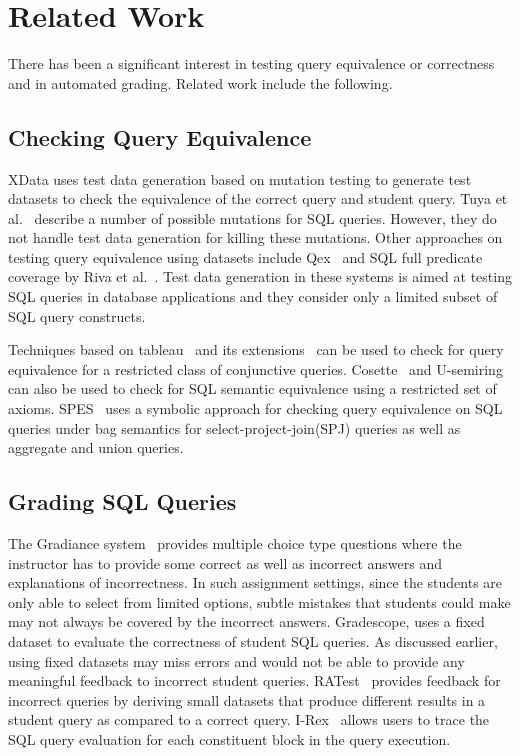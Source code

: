 \section{Related Work}
\label{sec:relwork}
There has been a significant interest in testing query equivalence or correctness and in automated grading. Related work include the following.

\subsection*{Checking Query Equivalence}

XData uses test data generation based on mutation testing to generate test datasets to check the equivalence of the correct query and student query. Tuya et al.~\cite{mutation1} describe a number of possible mutations for SQL queries. However, they do not handle test data generation for killing these mutations. Other approaches on testing query equivalence using datasets include Qex~\cite{QEX} and SQL full predicate coverage by Riva et al.~\cite{Riva:2010}. Test data generation in these systems is aimed at testing SQL queries in database applications and they consider only a limited subset of SQL query constructs. 

Techniques based on tableau~\cite{tableaux} and its extensions~\cite{tableaux1, tableaux2} can be used to check for query equivalence for a restricted class of conjunctive queries. Cosette~\cite{cosette} and U-semiring~\cite{semantic} can also be used to check for SQL semantic equivalence using a restricted set of axioms. 
SPES~\cite{spes} uses a symbolic approach for checking query equivalence on SQL queries under bag semantics for select-project-join(SPJ) queries as well as aggregate and union queries. 

\subsection*{Grading SQL Queries}
The Gradiance system~\cite{gradience} provides multiple choice type questions where the instructor has to provide some correct as well as incorrect answers and explanations of incorrectness. In such assignment settings, since the students are only able to select from limited options, subtle mistakes that students could make may not always be covered by the incorrect answers. Gradescope\cite{gradescope}, uses a fixed dataset to evaluate the correctness of student SQL queries. As discussed earlier, using fixed datasets may miss errors and would not be able to provide any meaningful feedback to incorrect student queries. RATest~\cite{rattest} provides feedback for incorrect queries by deriving small datasets that produce different results in a student query as compared to a correct query. I-Rex~\cite{irex} allows users to trace the SQL query evaluation for each constituent block in the query execution. 


